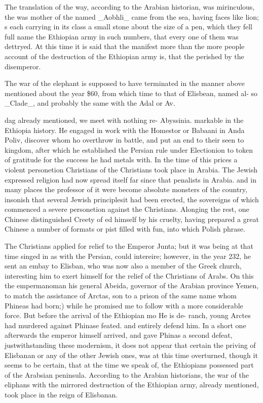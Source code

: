 The translation of the way, according to the Arabian historian, was mirinculous, the was mother of the named \_Aobhli\_ came from the sea, having faces like lion; s each carrying in its class a small stone about the size of a pen, which they fell full name the Ethiopian army in such numbers, that every one of them was dettryed. At this time it is said that the manifest more than the more people account of the destruction of the Ethiopian army is, that the perished by the disemperor.\par\medskip
The war of the elephant is supposed to have terminated in the manner above mentioned about the year \$60, from which time to that of Elisbean, named al- so \_Clade\_, and probably the same with the Adal or Av.\par\medskip
dag already mentioned, we meet with nothing re- Abyssinia. markable in the Ethiopia history. He engaged in work with the Homestor or Babaani in Anda Poliv, discover whom ho overthrow in battle, and put an end to their seen to kingdom, after which he established the Persian rule under Electionion to token of gratitude for the success he had metals with. In the time of this prices a violent personetion Christians of the Christians took place in Arabia. The Jewish expressed religion had now spread itself far since that penalists in Arabia. and in many places the professor of it were become absolute monsters of the country, insonish that several Jewish principlesit had been erected, the sovereigns of which commenced a severe personetion against the Christians. Alonging the rest, one Chinese distinguished Creety of ed himself by his cruelty, having prepared a great Chinese a number of formats or pist filled with fun, into which Polish phrase.\par\medskip
The Christians applied for relief to the Emperor Junta; but it was being at that time singed in as with the Persian, could intereire; however, in the year 232, he sent an embay to Elisban, who was now also a member of the Greek church, interesting him to exert himself for the relief of the Christians of Arabs. On this the empermanoman his general Abeida, governor of the Arabian province Yemen, to match the assistance of Arctas, son to a prison of the same name whom Phineas had born;) while he promised me to follow with a more considerable force. But before the arrival of the Ethiopian mo He is de- ranch, young Arctes had murdered against Phinase feated. and entirely defend him. In a short one afterwards the emperor himself arrived, and gave Phinas a second defeat, justwithstanding these modernism, it does not appear that certain the priving of Elisbanan or any of the other Jewish ones, was at this time overturned, though it seems to be certain, that at the time we speak of, the Ethiopians possessed part of the Arabsian peninsula. According to the Arabian historians, the war of the eliphans with the mirrored destruction of the Ethiopian army, already mentioned, took place in the reign of Elisbanan.\par\medskip
